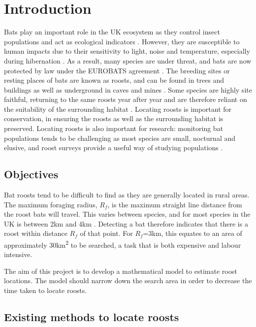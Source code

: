 
	\chapter{Introduction}
	\label{chapter:intro}


Bats play an important role in the UK ecosystem as they control insect
populations \cite{Kunz2011} and act as ecological indicators \cite{Jones2009}.
However, they are susceptible to human impacts due to their sensitivity to
light, noise and temperature, especially during hibernation \cite{Jones2009}. As
a result, many species are under threat, and bats are now protected by law under
the EUROBATS agreement \cite{Eurobats}. The breeding sites or resting places of
bats are known as roosts, and can be found in trees and buildings as well as
underground in caves and mines \cite{Eurobats}. Some species are highly site
faithful, returning to the same roosts year after year and are therefore reliant
on the suitability of the surrounding habitat \cite{Lewis1995}. Locating roosts
is important for conservation, in ensuring the roosts as well as the surrounding
habitat is preserved. Locating roosts is also important for research: monitoring
bat populations tends to be challenging as most species are small, nocturnal and
elusive, and roost surveys provide a useful way of studying populations
\cite{Flaquer2007}.

\section{Objectives}

Bat roosts tend to be difficult to find as they are generally located in rural
areas. The maximum foraging radius, $R_f$, is the maximum straight line distance from
the roost bats will travel. This varies between species, and for most species in the
UK is between 2km and 4km \cite{CSZ}. Detecting a bat therefore indicates that
there is a roost within distance $R_f$ of that point. For $R_f$=3km, this equates to
an area of approximately 30km\textsuperscript{2} to be searched, a task that is
both expensive and labour intensive.

The aim of this project is to develop a mathematical model to estimate roost
locations. The model should narrow down the search area in order to decrease the
time taken to locate roosts.


\section{Existing methods to locate roosts}

